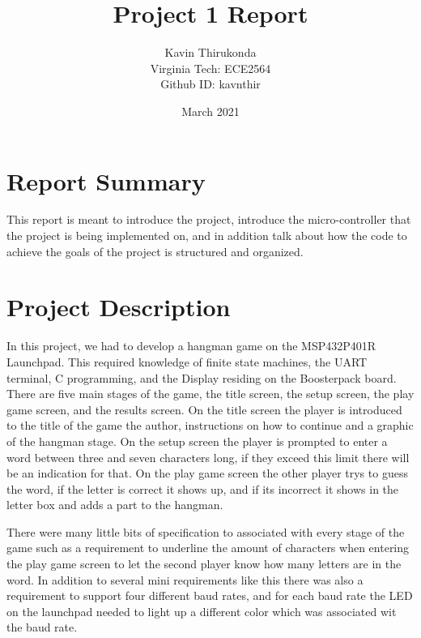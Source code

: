 \documentclass{article}
\title{Project 1 Report}
\author{Kavin Thirukonda\\
  Virginia Tech:  ECE2564\\
  Github ID: kavnthir
}
\date{March 2021}
\begin{document}
\maketitle
\newpage
\section{Report Summary}
\indent
This report is meant to introduce the project, introduce the micro-controller that the project is being implemented on, and in addition talk about how the code to achieve the goals of the project is structured and organized.
\section{Project Description}
\indent
In this project, we had to develop a hangman game on the MSP432P401R Launchpad. This required knowledge of finite state machines, the UART terminal, C programming, and the Display residing on the Boosterpack board. There are five main stages of the game, the title screen, the setup screen, the play game screen, and the results screen. On the title screen the player is introduced to the title of the game the author, instructions on how to continue and a graphic of the hangman stage. On the setup screen the player is prompted to enter a word between three and seven characters long, if they exceed this limit there will be an indication for that. On the play game screen the other player trys to guess the word, if the letter is correct it shows up, and if its incorrect it shows in the letter box and adds a part to the hangman.

There were many little bits of specification to associated with every stage of the game such as a requirement to underline the amount of characters when entering the play game screen to let the second player know how many letters are in the word. In addition to several mini requirements like this there was also a requirement to support four different baud rates, and for each baud rate the LED on the launchpad needed to light up a different color which was associated wit the baud rate.
\end{document}
